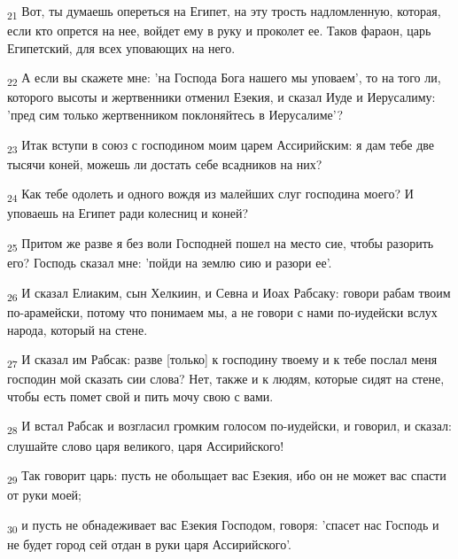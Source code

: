 \begin{tcolorbox}
\textsubscript{21} Вот, ты думаешь опереться на Египет, на эту трость надломленную, которая, если кто опрется на нее, войдет ему в руку и проколет ее. Таков фараон, царь Египетский, для всех уповающих на него.
\end{tcolorbox}
\begin{tcolorbox}
\textsubscript{22} А если вы скажете мне: 'на Господа Бога нашего мы уповаем', то на того ли, которого высоты и жертвенники отменил Езекия, и сказал Иуде и Иерусалиму: 'пред сим только жертвенником поклоняйтесь в Иерусалиме'?
\end{tcolorbox}
\begin{tcolorbox}
\textsubscript{23} Итак вступи в союз с господином моим царем Ассирийским: я дам тебе две тысячи коней, можешь ли достать себе всадников на них?
\end{tcolorbox}
\begin{tcolorbox}
\textsubscript{24} Как тебе одолеть и одного вождя из малейших слуг господина моего? И уповаешь на Египет ради колесниц и коней?
\end{tcolorbox}
\begin{tcolorbox}
\textsubscript{25} Притом же разве я без воли Господней пошел на место сие, чтобы разорить его? Господь сказал мне: 'пойди на землю сию и разори ее'.
\end{tcolorbox}
\begin{tcolorbox}
\textsubscript{26} И сказал Елиаким, сын Хелкиин, и Севна и Иоах Рабсаку: говори рабам твоим по-арамейски, потому что понимаем мы, а не говори с нами по-иудейски вслух народа, который на стене.
\end{tcolorbox}
\begin{tcolorbox}
\textsubscript{27} И сказал им Рабсак: разве [только] к господину твоему и к тебе послал меня господин мой сказать сии слова? Нет, также и к людям, которые сидят на стене, чтобы есть помет свой и пить мочу свою с вами.
\end{tcolorbox}
\begin{tcolorbox}
\textsubscript{28} И встал Рабсак и возгласил громким голосом по-иудейски, и говорил, и сказал: слушайте слово царя великого, царя Ассирийского!
\end{tcolorbox}
\begin{tcolorbox}
\textsubscript{29} Так говорит царь: пусть не обольщает вас Езекия, ибо он не может вас спасти от руки моей;
\end{tcolorbox}
\begin{tcolorbox}
\textsubscript{30} и пусть не обнадеживает вас Езекия Господом, говоря: 'спасет нас Господь и не будет город сей отдан в руки царя Ассирийского'.
\end{tcolorbox}
